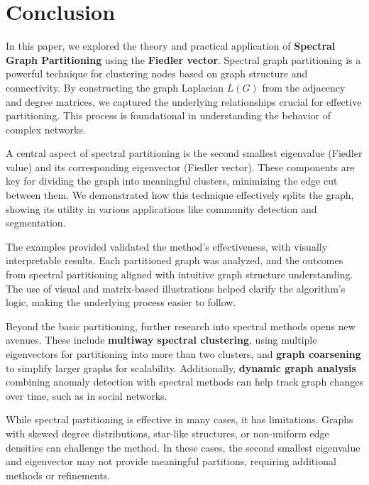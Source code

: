 \documentclass[hidelinks,12pt]{article}
\begin{document}
\section{Conclusion}

In this paper, we explored the theory and practical application of \textbf{Spectral Graph Partitioning} using the \textbf{Fiedler vector}. Spectral graph partitioning is a powerful technique for clustering nodes based on graph structure and connectivity. By constructing the graph Laplacian \( L(G) \) from the adjacency and degree matrices, we captured the underlying relationships crucial for effective partitioning. This process is foundational in understanding the behavior of complex networks.
\vspace{3mm}

\noindent A central aspect of spectral partitioning is the second smallest eigenvalue (Fiedler value) and its corresponding eigenvector (Fiedler vector). These components are key for dividing the graph into meaningful clusters, minimizing the edge cut between them. We demonstrated how this technique effectively splits the graph, showing its utility in various applications like community detection and segmentation.
\vspace{3mm}


\noindent The examples provided validated the method's effectiveness, with visually interpretable results. Each partitioned graph was analyzed, and the outcomes from spectral partitioning aligned with intuitive graph structure understanding. The use of visual and matrix-based illustrations helped clarify the algorithm’s logic, making the underlying process easier to follow.
\vspace{3mm}


\noindent Beyond the basic partitioning, further research into spectral methods opens new avenues. These include \textbf{multiway spectral clustering}, using multiple eigenvectors for partitioning into more than two clusters, and \textbf{graph coarsening} to simplify larger graphs for scalability. Additionally, \textbf{dynamic graph analysis} combining anomaly detection with spectral methods can help track graph changes over time, such as in social networks.
\vspace{3mm}


\noindent While spectral partitioning is effective in many cases, it has limitations. Graphs with skewed degree distributions, star-like structures, or non-uniform edge densities can challenge the method. In these cases, the second smallest eigenvalue and eigenvector may not provide meaningful partitions, requiring additional methods or refinements.
\vspace{3mm}
\end{document}
